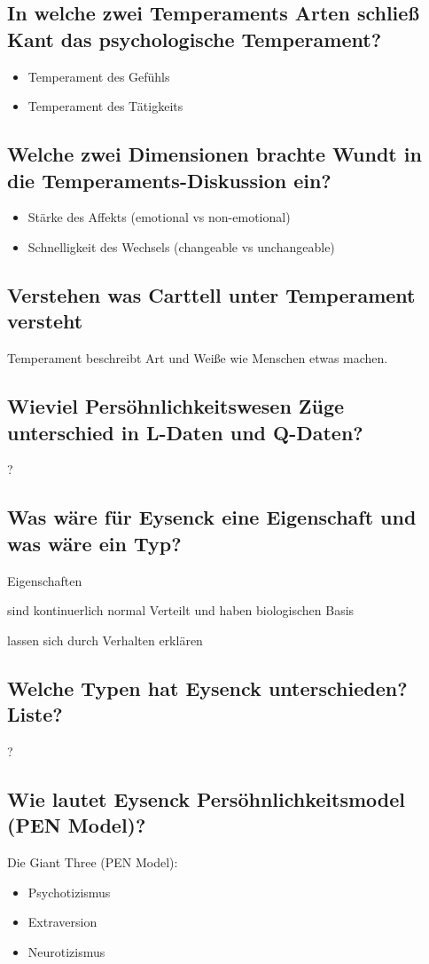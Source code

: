 \documentclass[a6paper,10pt,DIV=40]{scrartcl}
\begin{document}
\subsection{In welche zwei Temperaments Arten schließ Kant das psychologische Temperament?}
    \begin{itemize}
        \item Temperament des Gefühls
        \item Temperament des Tätigkeits
    \end{itemize}
\subsection{Welche zwei Dimensionen brachte Wundt in die Temperaments-Diskussion ein?}
    \begin{itemize}
        \item Stärke des Affekts (emotional vs non-emotional)
        \item Schnelligkeit des Wechsels (changeable vs unchangeable)
    \end{itemize}
\subsection{Verstehen was Carttell unter Temperament versteht}
    Temperament beschreibt Art und Weiße wie Menschen etwas machen.
\subsection{Wieviel Persöhnlichkeitswesen Züge unterschied in L-Daten und Q-Daten?}
    ?
\subsection{Was wäre für Eysenck eine Eigenschaft und was wäre ein Typ?}
    \begin{labeling}{Eigenschaften}
        \item [Typen] sind kontinuerlich normal Verteilt und haben biologischen Basis
        \item [Eigenschaften] lassen sich durch Verhalten erklären
    \end{labeling}
\subsection{Welche Typen hat Eysenck unterschieden? Liste?}
    ?
\subsection{Wie lautet Eysenck Persöhnlichkeitsmodel (PEN Model)?}
    Die Giant Three (PEN Model):\\
    \begin{itemize}
        \item Psychotizismus
        \item Extraversion
        \item Neurotizismus
    \end{itemize}
\end{document}
